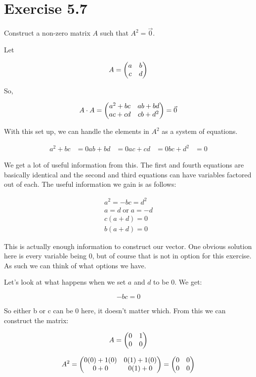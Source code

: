 \section*{Exercise 5.7}

Construct a non-zero matrix $A$ such that $A^2 = \vec{0}$.

Let 

\[
	A = \genericmat{p}{a&b\\c&d}
\]

So,

\[
A \cdot A = 
\genericmat{p}{
a^2 + bc & ab + bd \\
ac + cd & cb + d^2
} 
= \vec{0}
\]

With this set up, we can handle the elements in $A^2$ as a system of equations. 

\[
	\begin{aligned}
		a^2 + bc &= 0
		ab + bd &= 0
		ac + cd &= 0
		bc + d^2 &= 0
	\end{aligned}
\]

We get a lot of useful information from this. The first and fourth equations are basically identical and the second and third equations can have variables factored out of each. The useful information we gain is as follows:

\[
	\begin{aligned}
		a^2 = -bc = d^2 \\
		a = d \; \text{or} \; a = -d \\
		c(a + d) = 0 \\
		b(a + d) = 0
	\end{aligned}
\]

This is actually enough information to construct our vector. One obvious solution here is every variable being 0, but of course that is not in option for this exercise. As such we can think of what options we have. 

Let's look at what happens when we set $a$ and $d$ to be 0. We get:

\[-bc = 0\]

So either b or c can be 0 here, it doesn't matter which. From this we can construct the matrix:

\[A = 
	\genericmat{p}{0 & 1\\0&0}
\]

\[A^2 = 
	\genericmat{p}
	{
		0(0) + 1(0) & 0(1) + 1(0)\\
		0 + 0 & 0(1) + 0
	}
	=
	\genericmat{p}{0 & 0\\0 & 0}
\]

